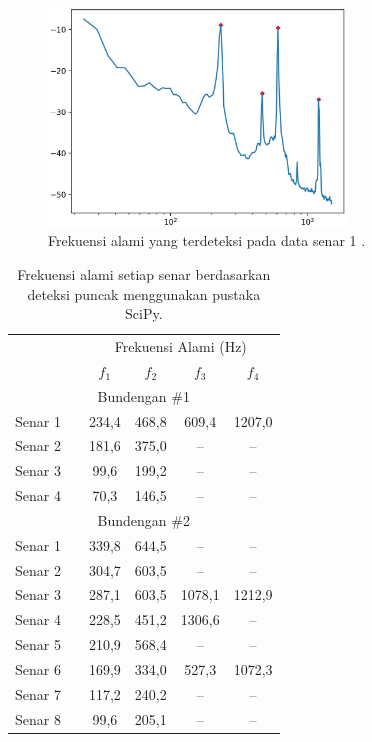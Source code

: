 \begin{figure}[h!]
	\centering
	\includegraphics[width=8cm]{Gambar/peak-detect-contoh.jpg}
	\caption{Frekuensi alami yang terdeteksi pada data senar 1 .}
	\label{fig:peak-detect-contoh}
\end{figure}

\begin{table}[b!]
	\centering
	\caption{Frekuensi alami setiap senar \bundengan berdasarkan deteksi puncak menggunakan pustaka SciPy.}
	\begin{tabular}{l c c c c c}
		\hline
		& & \multicolumn{4}{c}{Frekuensi Alami (Hz)} \\
		& & $f_1$ & $f_2$ & $f_3$ & $f_4$ \\
		\hline
		\multicolumn{6}{c}{Bundengan \#1} \\
		\hline
		Senar 1 && 234,4 & 468,8 & 609,4 & 1207,0 \\
		Senar 2 && 181,6 & 375,0 & -- & -- \\
		Senar 3 && 99,6 & 199,2 & -- & -- \\
		Senar 4 && 70,3 & 146,5 & -- & -- \\
		\hline
		\multicolumn{6}{c}{Bundengan \#2} \\
		\hline
		Senar 1 && 339,8 & 644,5 & -- & -- \\
		Senar 2 && 304,7 & 603,5 & -- & -- \\
		Senar 3 && 287,1 & 603,5 & 1078,1 & 1212,9 \\
		Senar 4 && 228,5 & 451,2 & 1306,6 & -- \\
		Senar 5 && 210,9 & 568,4 & -- & -- \\
		Senar 6 && 169,9 & 334,0 & 527,3 & 1072,3 \\
		Senar 7 && 117,2 & 240,2 & -- & -- \\
		Senar 8 && 99,6 & 205,1 & -- & -- \\
		\hline
	\end{tabular}
	\label{tab:hasil-detect}
\end{table}

